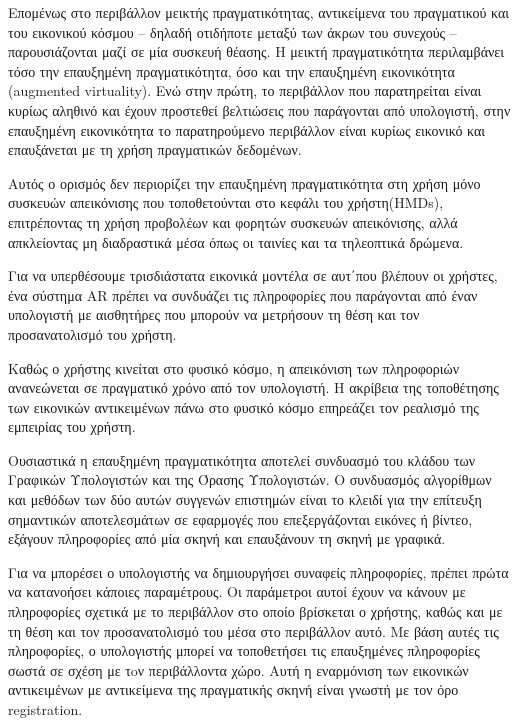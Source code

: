 Επομένως στο περιβάλλον μεικτής πραγματικότητας, αντικείμενα του πραγματικού και του εικονικού κόσμου – δηλαδή οτιδήποτε μεταξύ των άκρων του συνεχούς – παρουσιάζονται μαζί σε μία συσκευή θέασης. Η μεικτή πραγματικότητα περιλαμβάνει τόσο την επαυξημένη πραγματικότητα, όσο και την επαυξημένη εικονικότητα (augmented virtuality). Ενώ στην πρώτη, το περιβάλλον που παρατηρείται είναι κυρίως αληθινό και έχουν προστεθεί βελτιώσεις που παράγονται από υπολογιστή, στην επαυξημένη εικονικότητα το παρατηρούμενο περιβάλλον είναι κυρίως εικονικό και επαυξάνεται με τη χρήση πραγματικών δεδομένων.


Αυτός ο ορισμός δεν περιορίζει την επαυξημένη πραγματικότητα στη χρήση μόνο συσκευών απεικόνισης που τοποθετούνται στο κεφάλι του χρήστη(HMDs), επιτρέποντας τη χρήση προβολέων και φορητών συσκευών απεικόνισης, αλλά απκλείοντας μη διαδραστικά μέσα όπως οι ταινίες και τα τηλεοπτικά δρώμενα. 

Για να υπερθέσουμε τρισδιάστατα εικονικά μοντέλα σε αυτ΄που βλέπουν οι χρήστες, ένα σύστημα ΑR πρέπει να συνδυάζει τις πληροφορίες που παράγονται από έναν υπολογιστή με αισθητήρες που μπορούν να μετρήσουν τη θέση και τον προσανατολισμό του χρήστη. 

Καθώς ο χρήστης κινείται στο φυσικό κόσμο, η απεικόνιση των πληροφοριών ανανεώνεται σε πραγματικό χρόνο από τον υπολογιστή. Η ακρίβεια της τοποθέτησης των εικονικών αντικειμένων πάνω στο φυσικό κόσμο επηρεάζει τον ρεαλισμό της εμπειρίας του χρήστη.




Ουσιαστικά η επαυξημένη πραγματικότητα αποτελεί συνδυασμό του κλάδου των Γραφικών Υπολογιστών και της Όρασης Υπολογιστών. Ο συνδυασμός αλγορίθμων και μεθόδων των δύο αυτών συγγενών επιστημών είναι το κλειδί για την επίτευξη σημαντικών αποτελεσμάτων σε εφαρμογές που επεξεργάζονται εικόνες ή βίντεο, εξάγουν πληροφορίες από μία σκηνή και επαυξάνουν τη σκηνή με γραφικά.

Για να μπορέσει ο υπολογιστής να δημιουργήσει συναφείς πληροφορίες, πρέπει πρώτα να κατανοήσει κάποιες παραμέτρους. Οι παράμετροι αυτοί έχουν να κάνουν με πληροφορίες σχετικά με το περιβάλλον στο οποίο βρίσκεται ο χρήστης, καθώς και με τη θέση και τον προσανατολισμό του μέσα στο περιβάλλον αυτό. Με βάση αυτές τις πληροφορίες, ο υπολογιστής μπορεί να τοποθετήσει τις επαυξημένες πληροφορίες σωστά σε σχέση με τoν περιβάλλοντα χώρο. Αυτή η εναρμόνιση των εικονικών αντικειμένων με αντικείμενα της πραγματικής σκηνή είναι γνωστή με τον όρο registration. 

